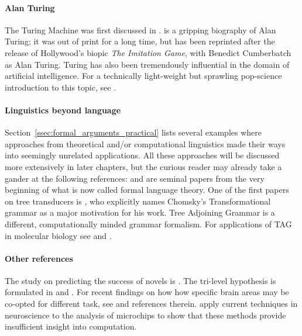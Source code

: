 \begin{literature}
\paragraph{Alan Turing}
The Turing Machine was first discussed in \citet{Turing36, Turing38}.
\citet{Hodges83} is a gripping biography of Alan Turing; it was out of print for a long time, but has been reprinted after the release of Hollywood's biopic \emph{The Imitation Game}, with Benedict Cumberbatch as Alan Turing.
Turing has also been tremendously influential in the domain of artificial intelligence. 
For a technically light-weight but sprawling pop-science introduction to this topic, see \citet{Hofstadter79}.

\paragraph{Linguistics beyond language}
Section~\ref{ssec:formal_arguments_practical} lists several examples where approaches from theoretical and\slash or computational linguistics made their ways into seemingly unrelated applications.
All these approaches will be discussed more extensively in later chapters, but the curious reader may already take a gander at the following references:
\citet{Chomsky57,Chomsky59} and \citet{ChomskySchuetzenberger63} are seminal papers from the very beginning of what is now called formal language theory.
One of the first papers on tree transducers is \citet{Rounds70}, who explicitly names Chomsky's Transformational grammar as a major motivation for his work.
Tree Adjoining Grammar \citep{Joshi85} is a different, computationally minded grammar formalism.
For applications of TAG in molecular biology see \citet{Uemura.etal99} and \citet{Matsui.etal05}.

\paragraph{Other references}
The study on predicting the success of novels is \citet{AshokEtAl13}.
The tri-level hypothesis is formulated in \citet{MarrPoggio76} and \citet{Marr82}.
For recent findings on how how specific brain areas may be co-opted for different task, see \citet{BolaEtAl17} and references therein.
\citet{JonasKording17} apply current techniques in neuroscience to the analysis of microchips to show that these methods provide insufficient insight into computation.
\end{literature}


